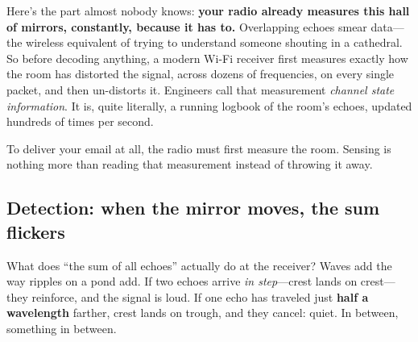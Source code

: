 \documentclass[11pt, letterpaper]{article}
\begin{document}
Here's the part almost nobody knows: \textbf{your radio already measures this hall of mirrors, constantly, because it has to.} Overlapping echoes smear data---the wireless equivalent of trying to understand someone shouting in a cathedral. So before decoding anything, a modern Wi-Fi receiver first measures exactly how the room has distorted the signal, across dozens of frequencies, on every single packet, and then un-distorts it. Engineers call that measurement \textit{channel state information}. It is, quite literally, a running logbook of the room's echoes, updated hundreds of times per second.

To deliver your email at all, the radio must first measure the room. Sensing is nothing more than reading that measurement instead of throwing it away.

\subsection{Detection: when the mirror moves, the sum flickers}

What does ``the sum of all echoes'' actually do at the receiver? Waves add the way ripples on a pond add. If two echoes arrive \textit{in step}---crest lands on crest---they reinforce, and the signal is loud. If one echo has traveled just \textbf{half a wavelength} farther, crest lands on trough, and they cancel: quiet. In between, something in between.
\end{document}
